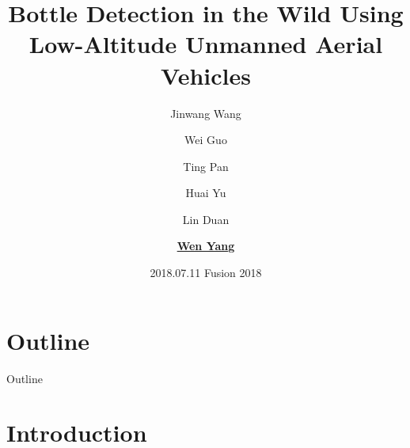 \documentclass[newPxFont,fullfooter,sectionpages, progressbar]{beamer}
\title{\centering Bottle Detection in the Wild Using Low-Altitude Unmanned Aerial Vehicles}
\author{\small Jinwang Wang \and Wei Guo \and Ting Pan \and Huai Yu \and Lin Duan \and \underline{\textbf{Wen Yang}}}
\institute{Wuhan University(WHU), Wuhan, China}
\date{2018.07.11 Fusion 2018}
\begin{document}
%
%

\maketitle
%
%

\section*{Outline}
\begin{frame}{Outline}
\tableofcontents[hideallsubsections]
\end{frame}

%
%

\section{Introduction}

\end{document}
